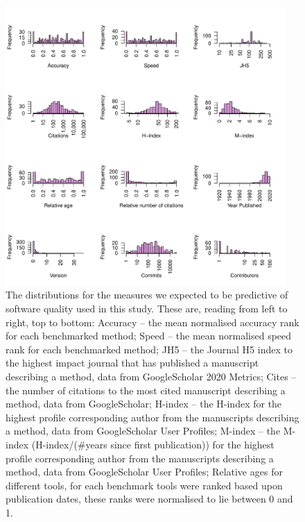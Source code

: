 \documentclass[fleqn,10pt]{SelfArx} %
\begin{document}
\begin{figure}[H]
\centering
\includegraphics[width=0.95\textwidth]{supplementary-figures-small.pdf}
\caption{The distributions for the measures we expected to be
  predictive of software quality used in this study. These
are, reading from left to right, top to bottom: Accuracy -- the mean
normalised accuracy rank for each benchmarked method; Speed -- the
mean normalised speed rank for each benchmarked method;
JH5 -- the Journal H5 index to the highest impact journal that has published
a manuscript describing a method, data from GoogleScholar 2020 Metrics;
Cites -- the number of citations to the most cited manuscript describing a method, data from GoogleScholar;
H-index -- the H-index for the highest profile corresponding author from the
manuscripts describing a method, data from GoogleScholar User Profiles;
M-index -- the M-index (H-index/(\#years since first publication)) for the
highest profile corresponding author from the manuscripts describing a method,
data from GoogleScholar User Profiles;
Relative ages for different tools, for each benchmark tools were ranked based upon publication dates, these ranks were normalised to lie between 0 and 1.
}
\label{fig:metricDistributions}
\end{figure}
\end{document}
